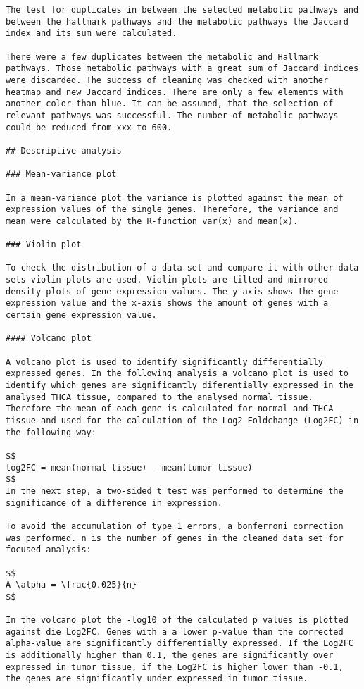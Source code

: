 \documentclass[
  parskip,
  oneside]{scrreprt}
\begin{document}
\begin{verbatim}
The test for duplicates in between the selected metabolic pathways and between the hallmark pathways and the metabolic pathways the Jaccard index and its sum were calculated.

There were a few duplicates between the metabolic and Hallmark pathways. Those metabolic pathways with a great sum of Jaccard indices were discarded. The success of cleaning was checked with another heatmap and new Jaccard indices. There are only a few elements with another color than blue. It can be assumed, that the selection of relevant pathways was successful. The number of metabolic pathways could be reduced from xxx to 600.

## Descriptive analysis

### Mean-variance plot

In a mean-variance plot the variance is plotted against the mean of expression values of the single genes. Therefore, the variance and mean were calculated by the R-function var(x) and mean(x).

### Violin plot

To check the distribution of a data set and compare it with other data sets violin plots are used. Violin plots are tilted and mirrored density plots of gene expression values. The y-axis shows the gene expression value and the x-axis shows the amount of genes with a certain gene expression value.

#### Volcano plot

A volcano plot is used to identify significantly differentially expressed genes. In the following analysis a volcano plot is used to identify which genes are significantly diferentially expressed in the analysed THCA tissue, compared to the analysed normal tissue. Therefore the mean of each gene is calculated for normal and THCA tissue and used for the calculation of the Log2-Foldchange (Log2FC) in the following way:

$$
log2FC = mean(normal tissue) - mean(tumor tissue)
$$
In the next step, a two-sided t test was performed to determine the significance of a difference in expression.

To avoid the accumulation of type 1 errors, a bonferroni correction was performed. n is the number of genes in the cleaned data set for focused analysis:

$$
A \alpha = \frac{0.025}{n}
$$

In the volcano plot the -log10 of the calculated p values is plotted against die Log2FC. Genes with a a lower p-value than the corrected alpha-value are significantly differentially expressed. If the Log2FC is additionally higher than 0.1, the genes are significantly over expressed in tumor tissue, if the Log2FC is higher lower than -0.1, the genes are significantly under expressed in tumor tissue.


\end{verbatim}
\end{document}
